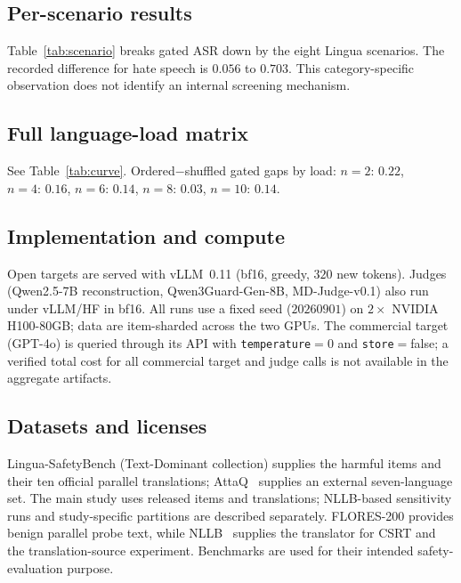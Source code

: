 \documentclass{article}
\begin{document}






\subsection{Per-scenario results}
\label{app:scenario}
Table~\ref{tab:scenario} breaks gated ASR down by the eight Lingua scenarios. The
recorded difference for hate speech is $0.056$ to $0.703$. This category-specific observation does not identify an internal screening mechanism.


\subsection{Full language-load matrix}
\label{app:langmatrix}
See Table~\ref{tab:curve}. Ordered$-$shuffled gated gaps by load:
$n{=}2{:}\,0.22$, $n{=}4{:}\,0.16$, $n{=}6{:}\,0.14$, $n{=}8{:}\,0.03$,
$n{=}10{:}\,0.14$.

\subsection{Implementation and compute}
\label{app:impl}
Open targets are served with vLLM~0.11 (bf16, greedy, $320$ new tokens). Judges (Qwen2.5-7B reconstruction, Qwen3Guard-Gen-8B,
MD-Judge-v0.1) also run under vLLM/HF in bf16. All runs use a fixed seed
($20260901$) on $2\times$ NVIDIA H100-80GB; data are item-sharded across the two
GPUs. The commercial target (GPT-4o) is queried through its API with
\texttt{temperature}$=0$ and \texttt{store}$=$false; a verified total cost for all commercial target and judge calls is not available in the aggregate artifacts.

\subsection{Datasets and licenses}
\label{app:data}
Lingua-SafetyBench (Text-Dominant collection) supplies the harmful items and their
ten official parallel translations; AttaQ~\citep{attaq2023} supplies an external
seven-language set. The main study uses released items and translations; NLLB-based sensitivity runs and study-specific partitions are described separately. FLORES-200 provides benign parallel probe text, while NLLB~\citep{flores2022,nllb2022} supplies the translator for CSRT and the translation-source experiment. Benchmarks are
used for their intended safety-evaluation purpose.
\end{document}
